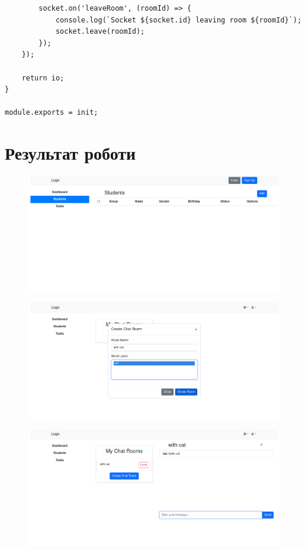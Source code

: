 \documentclass{article}
\begin{document}
\begin{normalsize}
\begin{lstlisting}
		socket.on('leaveRoom', (roomId) => {
			console.log(`Socket ${socket.id} leaving room ${roomId}`);
			socket.leave(roomId);
		});
	});
	
	return io;
}

module.exports = init;
\end{lstlisting}

\section*{Результат роботи}
\begin{figure}[H]
	\centering
	\includegraphics[width=\textwidth]{1}
\end{figure}

\begin{figure}[H]
	\centering
	\includegraphics[width=\textwidth]{2}
\end{figure}

\begin{figure}[H]
	\centering
	\includegraphics[width=\textwidth]{3}
\end{figure}


\end{normalsize}
\end{document}
